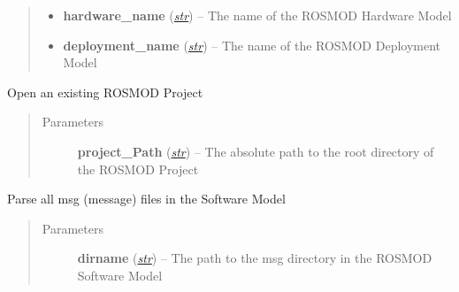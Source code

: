 \documentclass[letterpaper,10pt,english]{sphinxmanual}
\begin{document}
\begin{fulllineitems}
\begin{fulllineitems}
\begin{quote}
\begin{description}
\begin{itemize}
\item {} 
\textbf{hardware\_name} (\href{http://docs.python.org/library/functions.html\#str}{\emph{str}}) -- The name of the ROSMOD Hardware Model

\item {} 
\textbf{deployment\_name} (\href{http://docs.python.org/library/functions.html\#str}{\emph{str}}) -- The name of the ROSMOD Deployment Model

\end{itemize}

\end{description}\end{quote}

\end{fulllineitems}


\begin{fulllineitems}
\label{class_Project:ROSMOD_Project.open}
Open an existing ROSMOD Project
\begin{quote}\begin{description}
\item[{Parameters}] \leavevmode
\textbf{project\_Path} (\href{http://docs.python.org/library/functions.html\#str}{\emph{str}}) -- The absolute path to the root directory of the ROSMOD Project

\end{description}\end{quote}

\end{fulllineitems}


\begin{fulllineitems}
\label{class_Project:ROSMOD_Project.parse_msg}
Parse all msg (message) files in the Software Model
\begin{quote}\begin{description}
\item[{Parameters}] \leavevmode
\textbf{dirname} (\href{http://docs.python.org/library/functions.html\#str}{\emph{str}}) -- The path to the msg directory in the ROSMOD Software Model

\end{description}\end{quote}


\end{fulllineitems}
\end{fulllineitems}
\end{document}
